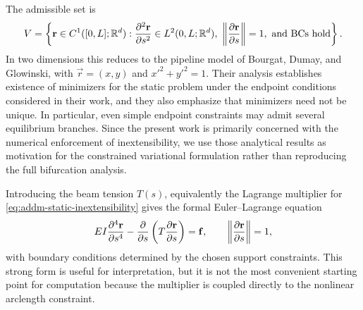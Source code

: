 The admissible set is
\begin{equation}\label{eq:addm-static-admissible-set}
    \begin{split}
        V =
        \left\{
        \mathbf{r} \in C^1([0,L];\mathbb{R}^d)
        :
        \pdv[2]{\mathbf{r}}{s} \in L^2(0,L;\mathbb{R}^d),
        \ \left\lVert \pdv{\mathbf{r}}{s} \right\rVert = 1,
        \ \text{and BCs hold}
        \right\}.
    \end{split}
\end{equation}
In two dimensions this reduces to the pipeline model of Bourgat, Dumay, and
Glowinski, with \(\vec r=(x,y)\) and \(x'^2+y'^2=1\). Their analysis establishes
existence of minimizers for the static problem under the endpoint conditions
considered in their work, and they also emphasize that minimizers need not be
unique. In particular, even simple endpoint constraints may admit several
equilibrium branches. Since the present work is primarily concerned with the
numerical enforcement of inextensibility, we use those analytical results as
motivation for the constrained variational formulation rather than reproducing
the full bifurcation analysis.

Introducing the beam tension \(T(s)\), equivalently the Lagrange multiplier for
\eqref{eq:addm-static-inextensibility} gives the formal Euler--Lagrange
equation
\begin{equation}\label{eq:addm-static-strong-form}
    EI \pdv[4]{\mathbf{r}}{s}
    -
    \pdv*{\left(T \pdv{\mathbf{r}}{s}\right)}{s}
    =
    \mathbf{f},
    \qquad
    \left\lVert \pdv{\mathbf{r}}{s} \right\rVert = 1,
\end{equation}
with boundary conditions determined by the chosen support constraints. This
strong form is useful for interpretation, but it is not the most convenient
starting point for computation because the multiplier is coupled directly to the
nonlinear arclength constraint.

